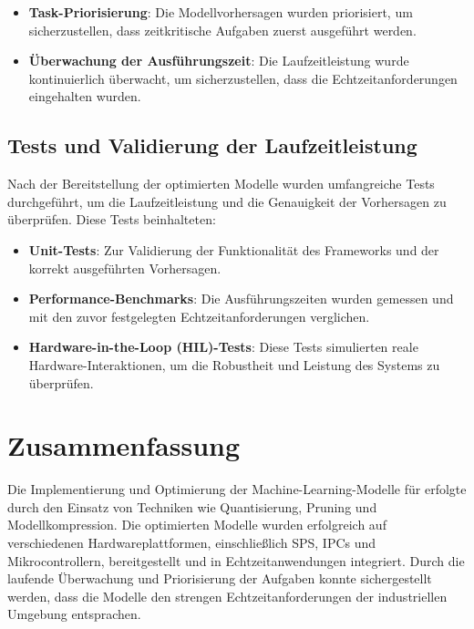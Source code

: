 \begin{itemize}
    \item \textbf{Task-Priorisierung}: Die Modellvorhersagen wurden priorisiert, um sicherzustellen, dass zeitkritische Aufgaben zuerst ausgeführt werden.
    \item \textbf{Überwachung der Ausführungszeit}: Die Laufzeitleistung wurde kontinuierlich überwacht, um sicherzustellen, dass die Echtzeitanforderungen 
    eingehalten wurden.
\end{itemize}

\subsection{Tests und Validierung der Laufzeitleistung}
Nach der Bereitstellung der optimierten Modelle wurden umfangreiche Tests durchgeführt, um die Laufzeitleistung und die Genauigkeit der Vorhersagen zu überprüfen. 
Diese Tests beinhalteten:

\begin{itemize}
    \item \textbf{Unit-Tests}: Zur Validierung der Funktionalität des Frameworks und der korrekt ausgeführten Vorhersagen.
    \item \textbf{Performance-Benchmarks}: Die Ausführungszeiten wurden gemessen und mit den zuvor festgelegten Echtzeitanforderungen verglichen.
    \item \textbf{Hardware-in-the-Loop (HIL)-Tests}: Diese Tests simulierten reale Hardware-Interaktionen, um die Robustheit und Leistung des Systems zu überprüfen.
\end{itemize}

\section{Zusammenfassung}
Die Implementierung und Optimierung der Machine-Learning-Modelle für \Emb erfolgte durch den Einsatz von Techniken wie Quantisierung, Pruning und Modellkompression. 
Die optimierten Modelle wurden erfolgreich auf verschiedenen Hardwareplattformen, einschließlich SPS, IPCs und Mikrocontrollern, bereitgestellt und in Echtzeitanwendungen 
integriert. Durch die laufende Überwachung und Priorisierung der Aufgaben konnte sichergestellt werden, dass die Modelle den strengen Echtzeitanforderungen der 
industriellen Umgebung entsprachen.
